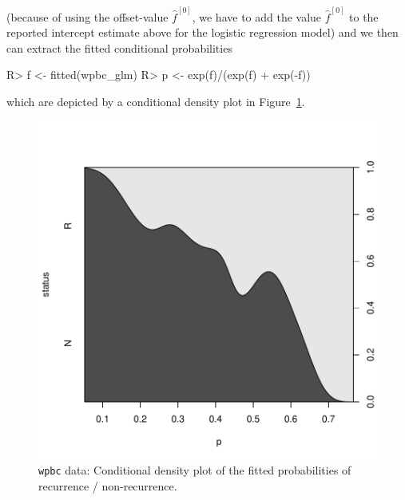 \documentclass{article}
\newcommand{\Robject}[1]{\texttt{#1}}
\newenvironment{Schunk}{}{}
\begin{document}
(because of using the offset-value $\hat{f}^{[0]}$, we have to add the value
$\hat{f}^{[0]}$ to the reported intercept estimate above for the logistic
regression model) and we then can
extract the fitted conditional probabilities  
\begin{Schunk}
\begin{Sinput}
R> f <- fitted(wpbc_glm)
R> p <- exp(f)/(exp(f) + exp(-f))
\end{Sinput}
\end{Schunk}
which are depicted by a conditional density plot in 
Figure~\ref{wpbc-glmboost-prob-plot}.

\begin{figure}
\begin{center}
\includegraphics{figures/BH-wpbc-glmboost-prob-plot}
\caption{\Robject{wpbc} data: Conditional density plot of the fitted 
         probabilities of recurrence / non-recurrence. \label{wpbc-glmboost-prob-plot}}
\end{center}
\end{figure}
\end{document}
